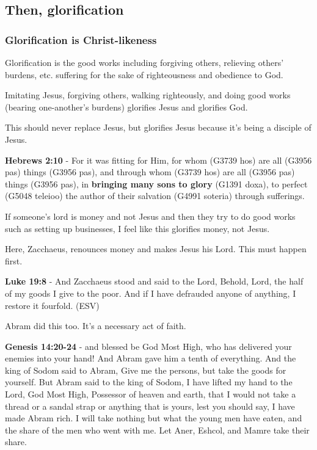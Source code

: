 \documentclass[11pt]{article}
\begin{document}
\subsection{Then, glorification}
\label{sec:orga23a608}
\subsubsection{Glorification is Christ-likeness}
\label{sec:org2e8f29e}
Glorification is the good works including forgiving others, relieving others' burdens, etc. suffering for the sake of righteousness and obedience to God.

Imitating Jesus, forgiving others, walking righteously, and doing good works (bearing one-another's burdens) glorifies Jesus and glorifies God.

This should never replace Jesus, but glorifies Jesus because it's being a disciple of Jesus.

\textbf{Hebrews 2:10} - For it was fitting for Him, for whom (G3739 hos) are all (G3956 pas) things (G3956 pas), and through whom (G3739 hos) are all (G3956 pas) things (G3956 pas), in \textbf{bringing many sons to glory} (G1391 doxa), to perfect (G5048 teleioo) the author of their salvation (G4991 soteria) through sufferings.

If someone's lord is money and not Jesus and then they try to do good works such as setting up businesses, I feel like this glorifies money, not Jesus.

Here, Zacchaeus, renounces money and makes Jesus his Lord. This must happen first.

\textbf{Luke 19:8} - And Zacchaeus stood and said to the Lord, Behold, Lord, the half of my goods I give to the poor. And if I have defrauded anyone of anything, I restore it fourfold. (ESV)

Abram did this too. It's a necessary act of faith.

\textbf{Genesis 14:20-24} - and blessed be God Most High, who has delivered your enemies into your hand! And Abram gave him a tenth of everything. And the king of Sodom said to Abram, Give me the persons, but take the goods for yourself. But Abram said to the king of Sodom, I have lifted my hand to the Lord, God Most High, Possessor of heaven and earth, that I would not take a thread or a sandal strap or anything that is yours, lest you should say, I have made Abram rich. I will take nothing but what the young men have eaten, and the share of the men who went with me. Let Aner, Eshcol, and Mamre take their share.
\end{document}
